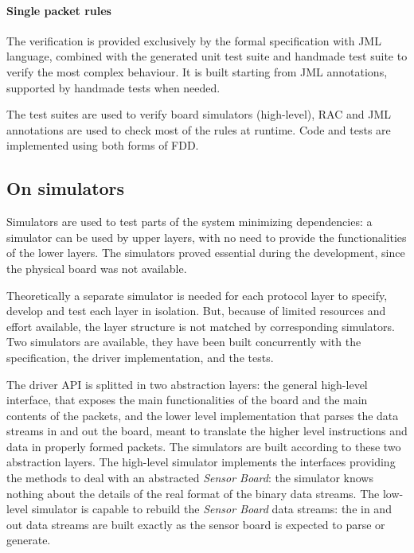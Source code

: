 \documentclass{article}
\newcommand{\SB}{\emph{Sensor Board}\xspace}
\begin{document}
\paragraph*{Single packet rules}

The verification is provided exclusively by the formal specification with JML language, combined with the generated unit test suite and handmade test suite to verify the most complex behaviour.
It is built starting from JML annotations, supported by handmade tests when needed.

The test suites are used to verify board simulators (high-level), RAC and JML annotations are used to check most of the rules at runtime.
Code and tests are implemented using both forms of FDD.



\subsection{On simulators}
\label{subsec:on_simulators}

Simulators are used to test parts of the system minimizing dependencies: a simulator can be used by upper layers, with no need to provide the functionalities of the lower layers. 
The simulators proved essential during the development, since the physical board was not available.

Theoretically a separate simulator is needed for each protocol layer to specify, develop and test each layer in isolation.  
But, because of limited resources and effort available, the layer structure is not matched by corresponding simulators.
Two simulators are available, they have been built concurrently with the specification, the driver implementation, and the tests.

The driver API is splitted in two abstraction layers: the general high-level interface, that exposes the main functionalities of the board and the main contents of the packets, and the lower level implementation that parses the data streams in and out the board, meant to translate the higher level instructions and data in properly formed packets.
The simulators are built according to these two abstraction layers.
The high-level simulator implements the interfaces providing the methods to deal with an abstracted \SB: the simulator knows nothing
about the details of the real format of the binary data streams.
The low-level simulator is capable to rebuild the \SB data streams: the in and out data streams are built exactly as the sensor board is expected to parse or generate.
\end{document}
